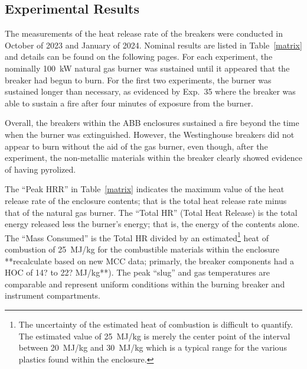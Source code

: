 \documentclass[12pt]{article}
\begin{document}
\subsection{Experimental Results}
\label{sec:results}
The measurements of the heat release rate of the breakers were conducted in October of 2023 and January of 2024. Nominal results are listed in Table~\ref{matrix} and details can be found on the following pages. For each experiment, the nominally 100~kW natural gas burner was sustained until it appeared that the breaker had begun to burn. For the first two experiments, the burner was sustained longer than necessary, as evidenced by Exp.~35 where the breaker was able to sustain a fire after four minutes of exposure from the burner.

Overall, the breakers within the ABB enclosures sustained a fire beyond the time when the burner was extinguished. However, the Westinghouse breakers did not appear to burn without the aid of the gas burner, even though, after the experiment, the non-metallic materials within the breaker clearly showed evidence of having pyrolized.

The ``Peak HRR'' in Table~\ref{matrix} indicates the maximum value of the heat release rate of the enclosure contents; that is the total heat release rate minus that of the natural gas burner. The ``Total HR'' (Total Heat Release) is the total energy released less the burner's energy; that is, the energy of the contents alone. The ``Mass Consumed'' is the Total HR divided by an estimated\footnote{The uncertainty of the estimated heat of combustion is difficult to quantify. The estimated value of 25~MJ/kg is merely the center point of the interval between 20~MJ/kg and 30~MJ/kg which is a typical range for the  various plastics found within the enclosure.} heat of combustion of 25~MJ/kg for the combustible materials within the enclosure **recalculate based on new MCC data; primarly, the breaker components had a HOC of 14? to 22? MJ/kg**). The peak ``slug'' and gas temperatures are comparable and represent uniform conditions within the burning breaker and instrument compartments.
\end{document}
